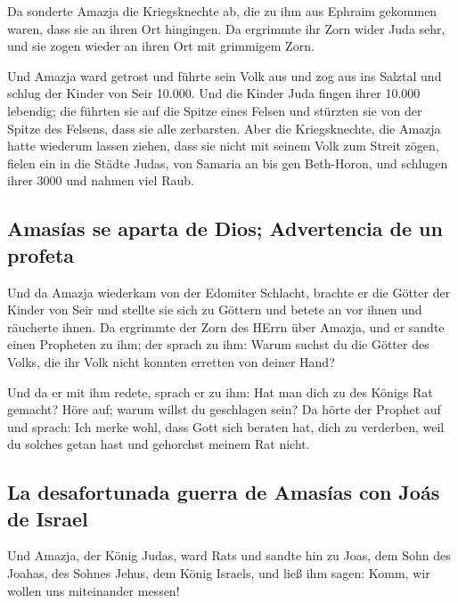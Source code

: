  Da sonderte Amazja die Kriegsknechte ab, die zu ihm aus
Ephraim gekommen waren, dass sie an ihren Ort hingingen. Da ergrimmte
ihr Zorn wider Juda sehr, und sie zogen wieder an ihren Ort mit
grimmigem Zorn.

 Und Amazja ward getrost und führte sein Volk aus und zog
aus ins Salztal und schlug der Kinder von Seir 10.000. 
Und die Kinder Juda fingen ihrer 10.000 lebendig; die führten sie auf
die Spitze eines Felsen und stürzten sie von der Spitze des Felsens,
dass sie alle zerbarsten.  Aber die Kriegsknechte, die
Amazja hatte wiederum lassen ziehen, dass sie nicht mit seinem Volk zum
Streit zögen, fielen ein in die Städte Judas, von Samaria an bis gen
Beth-Horon, und schlugen ihrer 3000 und nahmen viel Raub.

\hypertarget{amasuxedas-se-aparta-de-dios-advertencia-de-un-profeta}{%
\subsection{Amasías se aparta de Dios; Advertencia de un
profeta}\label{amasuxedas-se-aparta-de-dios-advertencia-de-un-profeta}}

 Und da Amazja wiederkam von der Edomiter Schlacht,
brachte er die Götter der Kinder von Seir und stellte sie sich zu
Göttern und betete an vor ihnen und räucherte ihnen.  Da
ergrimmte der Zorn des HErrn über Amazja, und er sandte einen Propheten
zu ihm; der sprach zu ihm: Warum suchst du die Götter des Volks, die ihr
Volk nicht konnten erretten von deiner Hand?

 Und da er mit ihm redete, sprach er zu ihm: Hat man dich
zu des Königs Rat gemacht? Höre auf; warum willst du geschlagen sein? Da
hörte der Prophet auf und sprach: Ich merke wohl, dass Gott sich beraten
hat, dich zu verderben, weil du solches getan hast und gehorchst meinem
Rat nicht.

\hypertarget{la-desafortunada-guerra-de-amasuxedas-con-jouxe1s-de-israel}{%
\subsection{La desafortunada guerra de Amasías con Joás de
Israel}\label{la-desafortunada-guerra-de-amasuxedas-con-jouxe1s-de-israel}}

 Und Amazja, der König Judas, ward Rats und sandte hin zu
Joas, dem Sohn des Joahas, des Sohnes Jehus, dem König Israels, und ließ
ihm sagen: Komm, wir wollen uns miteinander messen!

